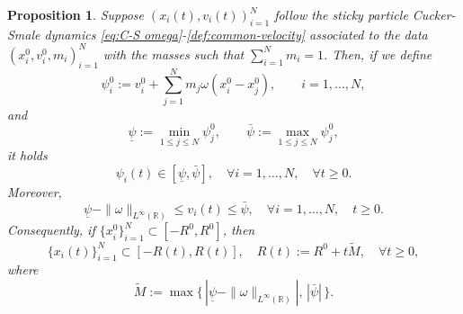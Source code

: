 \documentclass[11pt,a4paper,oneside]{amsart}
\newtheorem{prop}[definition]{Proposition}
\newcommand\R{\mathbb{R}}
\begin{document}
\begin{prop}\label{prop2.2}
    Suppose $(x_i(t),v_i(t))_{i=1}^N$ follow the sticky particle Cucker-Smale dynamics 
    \eqref{eq:C-S omega}-\eqref{def:common-velocity} associated to the data $(x_i^0,v_i^0,m_i)_{i=1}^N$ 
    with the masses such that $\displaystyle{\sum_{i=1}^N} m_i=1$. Then, if we define 
    $$
    \psi_i^0:=v_i^0+\sum_{j=1}^N m_j \omega(x_i^0-x_j^0),\qquad i=1,\dots,N,
    $$
    and
    $$
    \underline{\psi}:=\min_{1\leq j\leq N}\psi_j^0,\qquad \bar{\psi}:=\max_{1\leq j\leq N}\psi_j^0,
    $$
    it holds
    \begin{equation}\label{eq:boundnedness psi}
         \psi_i(t)\in [\underline\psi,\bar\psi],\quad\forall i=1,\dots,N,\quad\forall t\geq0.
    \end{equation}
    Moreover,
    \begin{equation}\label{eq:boundedness v}
        \underline\psi-\|\omega\|_{L^\infty(\R)}\leq v_i(t)\leq \bar\psi,\quad\forall i=1,\dots,N,\quad t\geq0.
    \end{equation}
    Consequently, if $\{x_i^0\}_{i=1}^N\subset [-R^0,R^0]$, then
    \begin{equation}\label{eq:boundedness x}
        \{x_i(t)\}_{i=1}^N\subset[-R(t),R(t)],\quad R(t):=R^0+t\tilde M,\quad\forall t\geq0,
    \end{equation}
    where 
    $$
    \tilde M:=\max\{\,|\underline\psi-\|\omega\|_{L^\infty(\R)}|,\,|\bar\psi|\,\}.
    $$
\end{prop}
\end{document}
